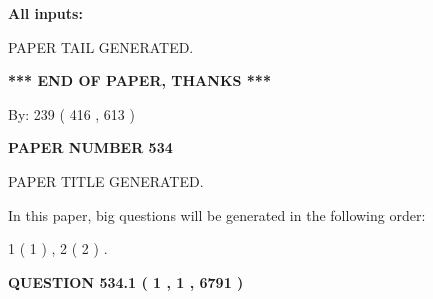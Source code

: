 \documentclass{ctexart}
\begin{document}
   
   
   
\noindent{}
   
   
   
   
\noindent\vspace{0.1in}\hspace{-0.08in} {\textbf{\Large{All inputs: }}}
   
   
   
   
   
   
 \vspace{0.2in}
 
   
   
\vspace{2.0in} PAPER TAIL GENERATED.
   
   
   
   
\vspace{1.0in} 
{\textbf{\large{ *** END OF PAPER, THANKS *** }}} 
   
   
\hspace{1.0in} By: 
 239 ( 416 ,  613 )
   
   
   
   
\newpage 
\setcounter{page}{ 
   534001 } 
   
   
   
   
 {\textbf{ \Large{ PAPER NUMBER  534  }}}
   
   
\vspace{0.2in}
   
   
   
   
   
   
   
   
 \vspace{0.2in}
 
 
 
 
   
   
 PAPER TITLE GENERATED.
   
   
   
\vspace{0.2in}
   
In this paper, big questions will be generated in the following order: 
   
   
   1 ( 1 )
 ,
   2 ( 2 )
 .
  
\vspace{0.2in}
  
{\textbf{\Large{QUESTION
534.1 
 ( 1 , 1 , 6791 )
}}}
  
\end{document}
